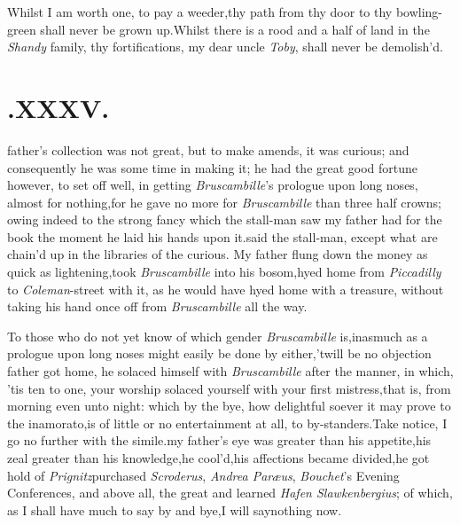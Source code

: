 \documentclass{article}
\begin{document}
Whilst I am worth one, to pay a\break
weeder,\tsk thy path from thy door to\break
thy bowling-green shall never be grown\break
up.\tsh Whilst there is a rood and a\break
half of land in the \textit{Shandy} family, thy\break
fortifications, my dear uncle \textit{Toby}, shall\break
never be demolish’d.

\section{.\quad  XXXV.}

 father’s collection was not
great, but to make amends, it was curious; and consequently he was
some time in making it; he had the great good fortune however, to
set off well, in getting \textit{Bruscambille}’s prologue upon
long noses, almost for nothing,\tsk for he gave no more for
\textit{Bruscambille} than three half crowns; owing indeed to the
strong fancy which the stall-man saw my father had for the book the
moment he laid his hands upon it.\tsk {}\tsk said the
stall-man, except what are chain’d up in the libraries of the
curious. My father flung down the mo\-ney as quick as
lightening,\tsk took \textit{Brus\-cambille} into his
bosom,\tsh hyed home from \textit{Piccadilly} to
\textit{Coleman}-street with it, as he would have hyed home with a
treasure, without taking his hand once off from
\textit{Bruscambille}
all the way.

To those who do not yet know of which gender \textit{Bruscambille}
is,\tsk inasmuch as a prologue upon long noses might easily
be done by either,\tsk ’twill be no objection 
father got home, he solaced
himself with \textit{Bruscambille} after the manner, in which,
’tis ten to one, your worship solaced yourself with your
first mistress,\tsh that is, from morning even unto night:
which by the bye, how delightful soever it may prove to the
inamorato,\tsk is of little or no entertainment at all, to
by-standers.\tsk Take notice, I go no further with the
simile.\tsk my father’s eye was greater than his
appetite,\tsk his zeal greater than his know\-ledge,\tsk he
cool’d,\tsk his affections became divided,\tsh he
got hold of \textit{Prig\-nitz}\tsk purchased \textit{Scroderus}, \textit{Andrea
Paræ\-us}, \textit{Bouchet}’s Evening Conferences, and above all,
the great and learned \textit{Hafen Slawkenbergius}; of which, as I
shall have much to say by and bye,\tsk I will say\break nothing now.
\end{document}
